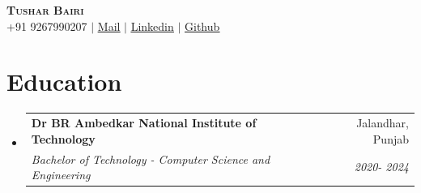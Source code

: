 \documentclass[letterpaper,11pt]{article}
\makeatletter
\newcommand{\resumeSubheading}[4]{
  \vspace{-2pt}\item
    \begin{tabular*}{0.97\textwidth}[t]{l@{\extracolsep{\fill}}r}
      \textbf{#1} & #2 \\
      \textit{\small#3} & \textit{\small #4} \\
    \end{tabular*}\vspace{-7pt}
}
\newcommand{\resumeSubHeadingListStart}{\begin{itemize}[leftmargin=0.15in, label={}]}
\newcommand{\resumeSubHeadingListEnd}{\end{itemize}}
\makeatother
\begin{document}
\vspace{-10pt}
\vspace{-5pt}
\begin{center}
    \textbf{\Huge \scshape Tushar Bairi} \\ \vspace{1pt}
    \small +91 9267990207 $|$ \href{mailto:tusharbairi75@gmail.com}{\underline{Mail}} $|$ 
    \href{https://www.linkedin.com/in/tushar-bairi-89482b202/}{\underline{Linkedin}} $|$
    \href{https://github.com/tushar-coin}{\underline{Github}}
\end{center}


\section{Education}
  \resumeSubHeadingListStart
    \resumeSubheading
      {Dr BR Ambedkar National Institute of Technology}{Jalandhar, Punjab}
      {Bachelor of Technology - Computer Science and Engineering }{2020- 2024}
  \resumeSubHeadingListEnd
  \vspace{-5pt}
\vspace{-10pt}
\end{document}
